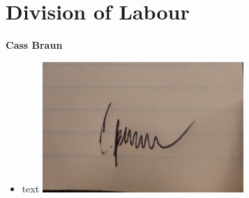 \documentclass[]{article}
\numberwithin{figure}{section}
\begin{document}
\appendix
\section{Division of Labour}
\label{sec:division_of_labour}



\textbf{Cass Braun}
\begin{itemize}
    \setlength\itemindent{2em}
    \item text
\includegraphics[width=0.6\textwidth]{Cass.jpg}
\end{itemize}
\end{document}
